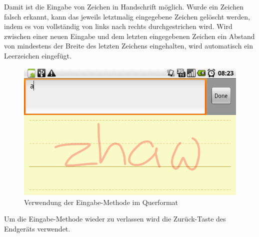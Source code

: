 Damit ist die Eingabe von Zeichen in Handschrift möglich. Wurde ein Zeichen falsch erkannt, kann das jeweils letztmalig eingegebene Zeichen gelöscht werden, indem es von vollständig von links nach rechts durchgestrichen wird. Wird zwischen einer neuen Eingabe und dem letzten eingegebenen Zeichen ein Abstand von mindestens der Breite des letzten Zeichens eingehalten, wird automatisch ein Leerzeichen eingefügt.

\begin{figure}[h!]
   \centering
   \includegraphics[width=\textwidth]{img/manual_landscape} 
   \caption{Verwendung der Eingabe-Methode im Querformat}
   \label{fig:manual_landscape}
\end{figure}

Um die Eingabe-Methode wieder zu verlassen wird die Zurück-Taste des Endgeräts verwendet.

